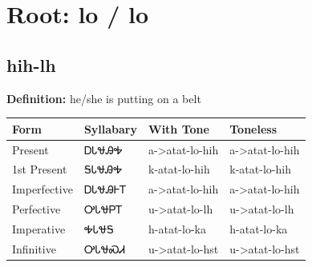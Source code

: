 \documentclass{article}%
\begin{document}
%
\normalsize%
\section*{Root: lo / lo}%
\subsection*{hih-lh}%
\textbf{Definition: }%
he/she is putting on a belt%
\\[0.5em]%
\begin{tabular}{|l|l|l|l|}%
\hline%
\textbf{Form}&\textbf{Syllabary}&\textbf{With Tone}&\textbf{Toneless}\\%
\hline%
Present&ᎠᏓᏠᎯᎭ&a{-}>atat{-}lo{-}hih&a{-}>atat{-}lo{-}hih\\%
1st Present&ᎦᏓᏠᎯᎭ&k{-}atat{-}lo{-}hih&k{-}atat{-}lo{-}hih\\%
Imperfective&ᎠᏓᏠᎯᎰᎢ&a{-}>atat{-}lo{-}hih&a{-}>atat{-}lo{-}hih\\%
Perfective&ᎤᏓᏠᏢᎢ&u{-}>atat{-}lo{-}lh&u{-}>atat{-}lo{-}lh\\%
Imperative&ᎭᏓᏠᎦ&h{-}atat{-}lo{-}ka&h{-}atat{-}lo{-}ka\\%
Infinitive&ᎤᏓᏠᏍᏗ&u{-}>atat{-}lo{-}hst&u{-}>atat{-}lo{-}hst\\%
\hline%
\end{tabular}%
\\[1em]%
\end{document}

